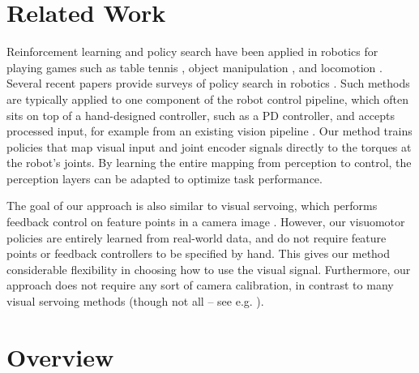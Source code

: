 \documentclass[final]{IEEEtran}
\begin{document}
\section{Related Work}
\label{sec:related}

Reinforcement learning and policy search have been applied in robotics for playing games such as table tennis \cite{kop-rlarm-10}, object manipulation \cite{drf-lclcm-11,phas-lgmsl-09}, and locomotion \cite{emmnc-lcbbl-08,gpw-fbwrc-06,kp-pgrlf-04,tzs-spgrl-04}. Several recent papers provide surveys of policy search in robotics \cite{dnp-spsr-13,kbp-rlrs-13}. Such methods are typically applied to one component of the robot control pipeline, which often sits on top of a hand-designed controller, such as a PD controller, and accepts processed input, for example from an existing vision pipeline \cite{phas-lgmsl-09}. Our method trains policies that map visual input and joint encoder signals directly to the torques at the robot's joints. By learning the entire mapping from perception to control, the perception layers can be adapted to optimize task performance.

The goal of our approach is also similar to visual servoing, which performs feedback control on feature points in a camera image \cite{ecr-navsr-92,mkd-vbcqp-14,whb-reecu-96}. However, our visuomotor policies are entirely learned from real-world data, and do not require feature points or feedback controllers to be specified by hand. This gives our method considerable flexibility in choosing how to use the visual signal. Furthermore, our approach does not require any sort of camera calibration, in contrast to many visual servoing methods (though not all -- see e.g. \cite{jfn-eeuvs-97,ya-auvs-94}).



\section{Overview}
\label{sec:overview}
\end{document}
